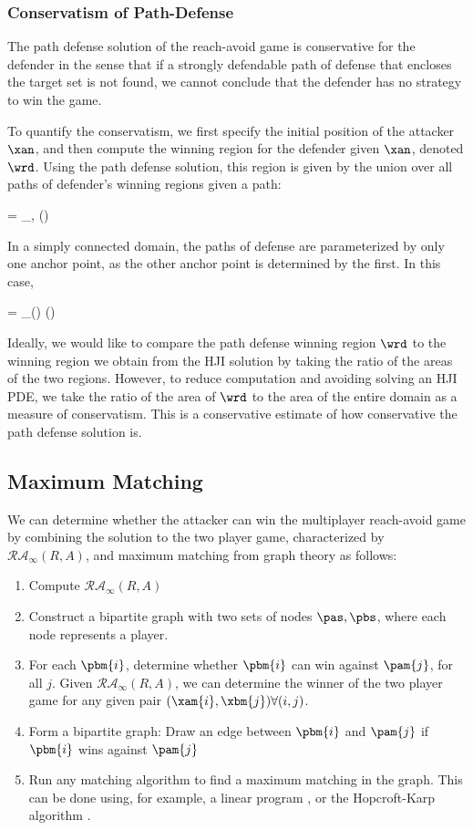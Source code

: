 \subsubsection{Conservatism of Path-Defense}
The path defense solution of the reach-avoid game is conservative for the defender in the sense that if a strongly defendable path of defense that encloses the target set is not found, we cannot conclude that the defender has no strategy to win the game. 

To quantify the conservatism, we first specify the initial position of the attacker $\xan$, and then compute the winning region for the defender given $\xan$, denoted $\wrd$. Using the path defense solution, this region is given by the union over all paths of defender's winning regions given a path:

\bq
\wrd = \bigcup_{\apa,\apb} (\rpd)
\eq

In a simply connected domain, the paths of defense are parameterized by only one anchor point, as the other anchor point is determined by the first. In this case, 

\bq
\wrd = \bigcup_{\apa(\apb)} (\rpd)
\eq

Ideally, we would like to compare the path defense winning region $\wrd$ to the winning region we obtain from the HJI solution by taking the ratio of the areas of the two regions. However, to reduce computation and avoiding solving an HJI PDE, we take the ratio of the area of $\wrd$ to the area of the entire domain as a measure of conservatism. This is a conservative estimate of how conservative the path defense solution is.

\subsection{Maximum Matching}
\label{subsec:max_match}
We can determine whether the attacker can win the multiplayer reach-avoid game by combining the solution to the two player game, characterized by $\mathcal{RA}_\infty(R,A)$, and maximum matching \cite{Schrjiver2004, Karpinski1998} from graph theory as follows:

\begin{enumerate}
\item Compute $\mathcal{RA}_\infty(R,A)$
\item Construct a bipartite graph with two sets of nodes $\pas,\pbs$, where each node represents a player.
\item For each $\pbm{i}$, determine whether $\pbm{i}$ can win against $\pam{j}$, for all $j$. Given $\mathcal{RA}_\infty(R,A)$, we can determine the winner of the two player game for any given pair $(\xam{i},\xbm{j}) \forall (i,j)$.
\item Form a bipartite graph: Draw an edge between $\pbm{i}$ and $\pam{j}$ if $\pbm{i}$ wins against $\pam{j}$
\item Run any matching algorithm to find a maximum matching in the graph. This can be done using, for example, a linear program \cite{Schrjiver2004}, or the Hopcroft-Karp algorithm \cite{Karpinski1998}.
\end{enumerate}

